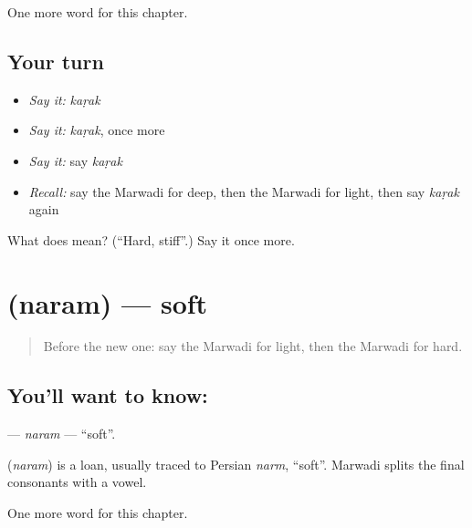 \begin{grammarlens}[title={What you've built}]
One more word for this chapter.
\end{grammarlens}

\subsection*{Your turn}
\begin{itemize}
\raggedright
  \item \emph{Say it:} \emph{kaṛak}
  \item \emph{Say it:} \emph{kaṛak}, once more
  \item \emph{Say it:} say \emph{kaṛak}
  \item \emph{Recall:} say the Marwadi for deep, then the Marwadi for light, then say \emph{kaṛak} again
\end{itemize}

\begin{tcolorbox}[breakable,colback=teal!4,colframe=teal!35!black,title={Before you move on}]
What does  mean? (\textquotedblleft{}Hard, stiff\textquotedblright{}.) Say it once more.
\end{tcolorbox}
\section[\texorpdfstring{\mw{नरम} (naram)}{नरम (naram)}]{ (naram) — soft}

\label{lesson:MW-C142-naram}



\begin{quote}
Before the new one: say the Marwadi for light, then the Marwadi for hard.
\end{quote}

\subsection*{You'll want to know: }
\textbf{} — \emph{naram} — \textquotedblleft{}soft\textquotedblright{}.

\begin{cousinweb}
\textbf{} (\emph{naram}) is a loan, usually traced to Persian \emph{narm}, \textquotedblleft{}soft\textquotedblright{}. Marwadi splits the final consonants with a vowel.
\end{cousinweb}

\begin{grammarlens}[title={What you've built}]
One more word for this chapter.
\end{grammarlens}

